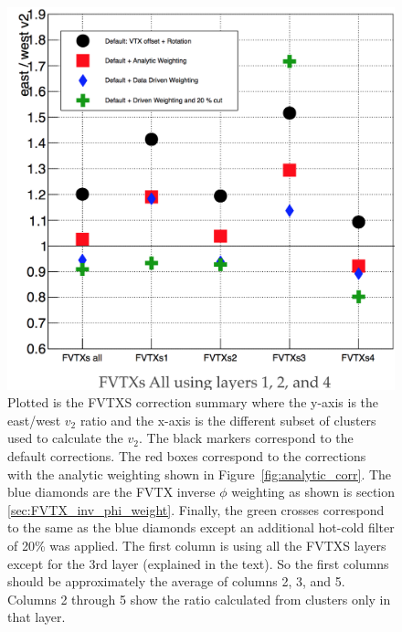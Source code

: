 \begin{figure}[!h]
\begin{center}
\includegraphics[width=0.5\linewidth]{figs/fvtx_correction_summary.png}
\caption{Plotted is the FVTXS correction summary where the y-axis is the east/west $v_2$ ratio and the x-axis is the different subset of clusters used to calculate the $v_2$. The black markers correspond to the default corrections. The red boxes correspond to the corrections with the analytic weighting shown in Figure~\ref{fig:analytic_corr}. The blue diamonds are the FVTX inverse $\phi$ weighting as shown is section \ref{sec:FVTX_inv_phi_weight}. Finally, the green crosses correspond to the same as the blue diamonds except an additional hot-cold filter of 20\% was applied. The first column is using all the FVTXS layers except for the 3rd layer (explained in the text). So the first columns should be approximately the average of columns 2, 3, and 5. Columns 2 through 5 show the ratio calculated from clusters only in that layer.}
\label{fig:fvtx_corr_summary}
\end{center}
\end{figure}


